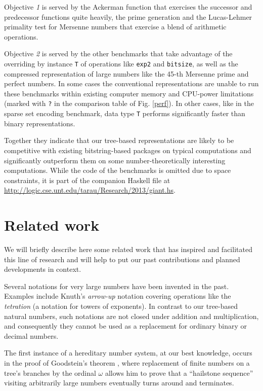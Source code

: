 \documentclass{TOOLS/llncs}
\begin{document}
Objective {\em 1} is served by the Ackerman function that exercises the successor and predecessor functions quite heavily, the prime generation and the Lucas-Lehmer primality test for Mersenne numbers that exercise a blend of arithmetic operations.

Objective {\em 2} is served by the other benchmarks that take advantage of the overriding by instance {\tt T} of operations like {\tt exp2} and {\tt bitsize}, as well as the  compressed representation of large numbers like the 45-th Mersenne prime and perfect numbers. In some cases the conventional representations are unable to run these benchmarks within existing computer memory and CPU-power limitations (marked with {\tt ?} in the comparison table of Fig. \ref{perf}). In other cases, like in the sparse set encoding benchmark, data type {\tt T} performs significantly faster than binary representations.

Together they indicate that our tree-based representations are likely to be competitive with existing bitstring-based packages on typical computations and significantly outperform them on some number-theoretically interesting computations. While the code of the benchmarks is omitted due to space constraints, it is part of the companion Haskell file at \url{http://logic.cse.unt.edu/tarau/Research/2013/giant.hs}.



\section{Related work} \label{related}

We will briefly describe here some related work
that has inspired and facilitated this line of research
and will help to put our past contributions and planned
developments in context.

Several notations for very large numbers have been invented in the past. Examples
include Knuth's {\em arrow-up} notation \cite{knuthUp}
covering operations like the {\em tetration} (a notation for towers of exponents).
In contrast to our tree-based natural numbers,
such notations are not closed under
addition and multiplication, and consequently
they cannot be used as a replacement
for ordinary binary or decimal numbers.

The first instance of a hereditary number system, at our best knowledge,
occurs in the proof of Goodstein's theorem \cite{goodstein}, where
replacement of finite numbers on a tree's branches by the ordinal $\omega$
allows him to prove that a ``hailstone sequence'' visiting arbitrarily
large numbers eventually turns around and terminates.
\end{document}
